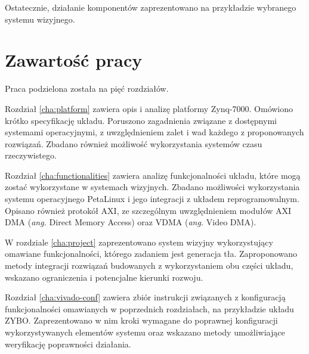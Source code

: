 Ostatecznie, działanie komponentów zaprezentowano na przykładzie wybranego systemu wizyjnego. %

\section{Zawartość pracy}

Praca podzielona została na pięć rozdziałów. %

Rozdział \ref{cha:platform} zawiera opis i analizę platformy Zynq-7000. Omówiono krótko specyfikację układu. Poruszono zagadnienia związane z dostępnymi systemami operacyjnymi, z uwzględnieniem zalet i wad każdego z proponowanych rozwiązań. Zbadano również możliwość wykorzystania systemów czasu rzeczywistego.

Rozdział \ref{cha:functionalities} zawiera analizę funkcjonalności układu, które mogą zostać wykorzystane w systemach wizyjnych. Zbadano możliwości wykorzystania systemu operacyjnego PetaLinux i jego integracji z układem reprogramowalnym. Opisano również protokół AXI, ze szczególnym uwzględnieniem modułów AXI DMA (\emph{ang.} Direct Memory Access) oraz VDMA (\emph{ang.} Video DMA).

W rozdziale \ref{cha:project} zaprezentowano system wizyjny wykorzystujący omawiane funkcjonalności, którego zadaniem jest generacja tła. Zaproponowano metody integracji rozwiązań budowanych z wykorzystaniem obu części układu, wskazano ograniczenia i potencjalne kierunki rozwoju. %

Rozdział \ref{cha:vivado-conf} zawiera zbiór instrukcji związanych z konfiguracją funkcjonalności omawianych w poprzednich rozdziałach, na przykładzie układu ZYBO. Zaprezentowano w nim kroki wymagane do poprawnej konfiguracji wykorzystywanych elementów systemu oraz wskazano metody umożliwiające weryfikację poprawności działania.